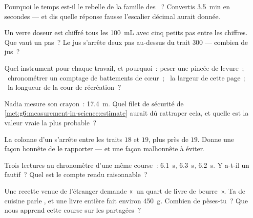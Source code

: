 \begin{exercise}[$\star$]\label{exo:g6:measurement-in-science:3}
Pourquoi le temps est-il le rebelle de la famille des ~?
Convertis \qty{3.5}{min} en secondes --- et dis quelle réponse fausse
l'escalier décimal aurait donnée.
\end{exercise}

\begin{exercise}[$\star$]\label{exo:g6:measurement-in-science:4}
Un verre doseur est chiffré tous les \qty{100}{mL} avec cinq petits
pas entre les chiffres. Que vaut un pas~? Le jus s'arrête deux pas
au-dessus du trait $300$ --- combien de jus~?
\end{exercise}

\begin{exercise}[$\star$]\label{exo:g6:measurement-in-science:5}
Quel instrument pour chaque travail, et pourquoi~: peser une pincée
de levure~; \ chronométrer un comptage de battements de cœur~; \ la
largeur de cette page~; \ la longueur de la cour de récréation~?
\end{exercise}

\begin{exercise}[$\star$]\label{exo:g6:measurement-in-science:6}
Nadia mesure son crayon~: \qty{17.4}{m}. Quel filet de sécurité de
\cref{met:g6:measurement-in-science:estimate} aurait dû rattraper
cela, et quelle est la valeur vraie la plus probable~?
\end{exercise}

\begin{exercise}[$\star$]\label{exo:g6:measurement-in-science:7}
La colonne d'un  s'arrête entre les traits $18$ et $19$,
plus près de $19$. Donne une façon honnête de le rapporter --- et une
façon malhonnête à éviter.
\end{exercise}

\begin{exercise}[$\star$]\label{exo:g6:measurement-in-science:8}
Trois lectures au chronomètre d'une même course~: \qty{6.1}{s},
\qty{6.3}{s}, \qty{6.2}{s}. Y a-t-il un fautif~? Quel est le compte
rendu raisonnable~?
\end{exercise}

\begin{exercise}[$\star\star$]\label{exo:g6:measurement-in-science:9}
Une recette venue de l'étranger demande «~un quart de livre de
beurre~». Ta  de cuisine parle , et une livre entière
fait environ \qty{450}{g}. Combien de  pèses-tu~? Que nous
apprend cette course sur les  partagées~?
\end{exercise}

